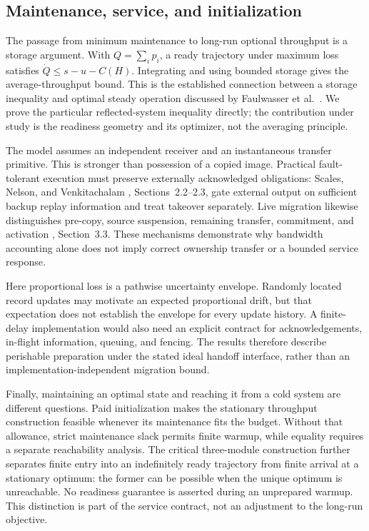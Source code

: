 \subsection{Maintenance, service, and initialization}

The passage from minimum maintenance to long-run optional throughput is a
storage argument. With $Q=\sum_i p_i$, a ready trajectory under maximum loss
satisfies $\dot Q\leq s-u-C(H)$. Integrating and using bounded storage gives
the average-throughput bound. This is the established connection between a
storage inequality and optimal steady operation discussed by Faulwasser
et al.\ \cite{FaulwasserEtAl2017}. We prove the particular reflected-system
inequality directly; the contribution under study is the readiness geometry
and its optimizer, not the averaging principle.

The model assumes an independent receiver and an instantaneous transfer
primitive. This is stronger than possession of a copied image. Practical
fault-tolerant execution must preserve externally acknowledged obligations:
Scales, Nelson, and Venkitachalam
\cite{ScalesNelsonVenkitachalam2010}, Sections~2.2--2.3, gate external output
on sufficient backup replay information and treat takeover separately.
Live migration likewise distinguishes pre-copy, source suspension, remaining
transfer, commitment, and activation \cite{ClarkEtAl2005}, Section~3.3.
These mechanisms demonstrate why bandwidth accounting alone does not imply
correct ownership transfer or a bounded service response.

Here proportional loss is a pathwise uncertainty envelope. Randomly located
record updates may motivate an expected proportional drift, but that
expectation does not establish the envelope for every update history. A
finite-delay implementation would also need an explicit contract for
acknowledgements, in-flight information, queuing, and fencing. The results
therefore describe perishable preparation under the stated ideal handoff
interface, rather than an implementation-independent migration bound.

Finally, maintaining an optimal state and reaching it from a cold system are
different questions. Paid initialization makes the stationary throughput
construction feasible whenever its maintenance fits the budget. Without that
allowance, strict maintenance slack permits finite warmup, while equality
requires a separate reachability analysis. The critical three-module
construction further separates finite entry into an indefinitely ready
trajectory from finite arrival at a stationary optimum: the former can be
possible when the unique optimum is unreachable. No readiness guarantee is
asserted during an unprepared warmup. This distinction is part of the service
contract, not an adjustment to the long-run objective.

